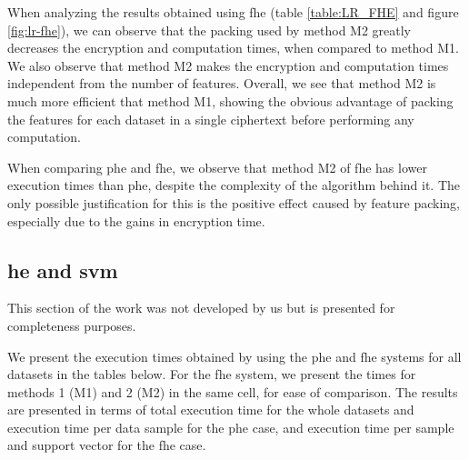 When analyzing the results obtained using \ac{fhe} (table \ref{table:LR_FHE} and figure \ref{fig:lr-fhe}), we can observe that the packing used by method M2 greatly decreases the encryption and computation times, when compared to method M1. We also observe that method M2 makes the encryption and computation times independent from the number of features.
Overall, we see that method M2 is much more efficient that method M1, showing the obvious advantage of packing the features for each dataset in a single ciphertext before performing any computation.

When comparing \ac{phe} and \ac{fhe}, we observe that method M2 of \ac{fhe} has lower execution times than \ac{phe}, despite the complexity of the algorithm behind it. The only possible justification for this is the positive effect caused by feature packing, especially due to the gains in encryption time.




\subsection{\acl{he} and \acl{svm}}

This section of the work was not developed by us but is presented for completeness purposes.

We present the execution times obtained by using the \ac{phe} and \ac{fhe} systems for all datasets in the tables below. For the \ac{fhe} system, we present the times for methods 1 (M1) and 2 (M2) in the same cell, for ease of comparison. The results are presented in terms of total execution time for the whole datasets and execution time per data sample for the \ac{phe} case, and execution time per sample and support vector for the \ac{fhe} case.



